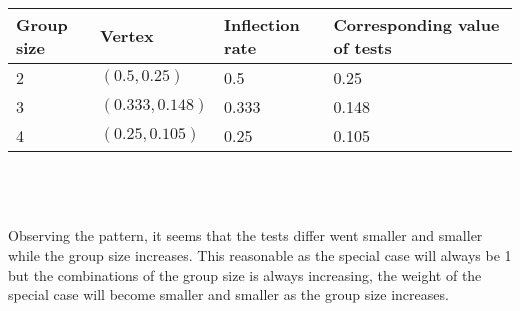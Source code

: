 \\
\begin{tabular}{p{3cm}p{3.5cm}p{3.5cm}p{6cm}}
\toprule
\textbf{Group size}&\textbf{Vertex}&\textbf{Inflection rate}&\textbf{Corresponding value of tests}\\
\toprule
2&$(0.5,0.25)$&0.5&0.25\\
\midrule
3&$(0.333,0.148)$&0.333&0.148\\
\midrule
4&$(0.25,0.105)$&0.25&0.105\\
\bottomrule
\end{tabular}
\\
\\
\\
Observing the pattern, it seems that the tests differ went smaller and smaller while the group size increases. This reasonable as the special case will always be 1 but the combinations of the group size is always increasing, the weight of the special case will become smaller and smaller as the group size increases. 